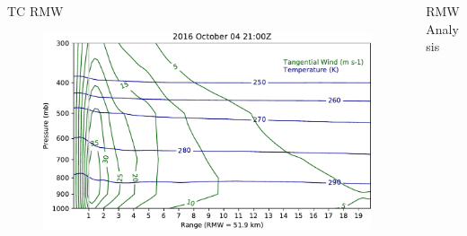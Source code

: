 \documentclass[final]{beamer}
\newlength{\onecolwid}
\newlength{\twocolwid}
\begin{document}
\begin{frame}[t]
\begin{columns}[t]
\begin{column}{\twocolwid}
\begin{columns}[t,totalwidth=\twocolwid]
\begin{column}{\onecolwid}
\begin{block}{TC RMW}
\begin{figure}
\end{figure}
\begin{figure}
\includegraphics[width=1.0\linewidth]{../plots/cross_section_2016100421.pdf}
\end{figure}

\end{block}


\end{column} %

\begin{column}{\onecolwid} %


\begin{block}{RMW Analysis}


\end{block}
\end{column}
\end{columns}
\end{column}
\end{columns}
\end{frame}
\end{document}

